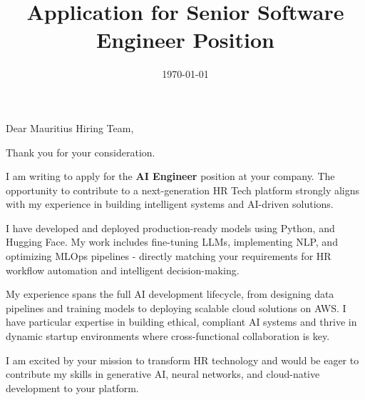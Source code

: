 \documentclass[11pt,a4paper,roman]{moderncv}
\title{Application for Senior Software Engineer Position}
\begin{document}
	
	\date{\today}
	\opening{Dear Mauritius Hiring Team,}
	\closing{Thank you for your consideration.}
	\makelettertitle
	
	I am writing to apply for the \textbf{AI Engineer} position at your company. The opportunity to contribute to a next-generation HR Tech platform strongly aligns with my experience in building intelligent systems and AI-driven solutions.
	
	I have developed and deployed production-ready models using Python, and Hugging Face. My work includes fine-tuning LLMs, implementing NLP, and optimizing MLOps pipelines - directly matching your requirements for HR workflow automation and intelligent decision-making.
	
	My experience spans the full AI development lifecycle, from designing data pipelines and training models to deploying scalable cloud solutions on AWS. I have particular expertise in building ethical, compliant AI systems and thrive in dynamic startup environments where cross-functional collaboration is key.
	
	I am excited by your mission to transform HR technology and would be eager to contribute my skills in generative AI, neural networks, and cloud-native development to your platform.
	
	
	\makeletterclosing
	
\end{document}
